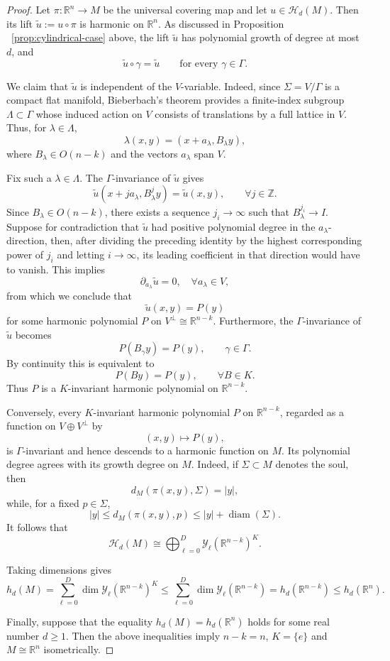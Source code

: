 \documentclass[12pt]{amsart}
\theoremstyle{plain}
\theoremstyle{definition}
\theoremstyle{remark}     %
\numberwithin{equation}{section}
\begin{document}
\begin{proof}
Let
$
\pi:\mathbb R^n\longrightarrow M
$
be the universal covering map and let $u\in\mathcal H_d(M)$. Then its lift
$\widetilde u:=u\circ\pi$
is harmonic on $\mathbb R^n$. 
As discussed in Proposition ~\ref{prop:cylindrical-case} above, the lift $\widetilde u$ has polynomial growth of degree at most $d$, and
\[
\widetilde u\circ\gamma=\widetilde u
\qquad\text{for every }\gamma\in\Gamma.
\]

We claim that $\widetilde u$ is independent of the $V$-variable.
Indeed, since $\Sigma=V/\Gamma$ is a compact flat manifold, Bieberbach's
theorem provides a finite-index subgroup $\Lambda\subset\Gamma$ whose
induced action on $V$ consists of translations by a full lattice in
$V$.  Thus, for $\lambda\in\Lambda$,
\[
\lambda(x,y)
=
(x+a_\lambda,B_\lambda y),
\]
where $B_\lambda\in O(n-k)$ and the vectors $a_\lambda$ span $V$.

Fix such a $\lambda\in \Lambda$.  The $\Gamma$-invariance of $\widetilde u$ gives
\[
\widetilde u(x+ja_\lambda,B_\lambda^j y)
=
\widetilde u(x,y),
\qquad \forall j\in\mathbb Z.
\]
Since $B_\lambda\in O(n-k)$, there exists a sequence
$j_i\to\infty$ such that $B_\lambda^{j_i}\longrightarrow I.$
Suppose for contradiction that $\widetilde u$ had positive polynomial degree in the
$a_\lambda$-direction, then, after dividing the preceding identity by
the highest corresponding power of $j_i$ and letting
$i\to\infty$, its leading coefficient in that direction would have
to vanish.  This implies 
\[
\partial_{a_\lambda}\widetilde u=0,\quad  \forall a_{\lambda}\in V,
\]
from which we conclude that
\[
\widetilde u(x,y)=P(y)
\]
for some harmonic polynomial $P$ on $V^\perp\cong \mathbb R^{n-k}$.
Furthermore, the $\Gamma$-invariance of $\tilde{u}$ becomes
\[
P(B_\gamma y)=P(y),
\qquad \gamma\in\Gamma.
\]
By continuity this is equivalent to
\[
P(By)=P(y),
\qquad \forall B\in K.
\]
Thus $P$ is a $K$-invariant harmonic polynomial on $\mathbb R^{n-k}$.

Conversely, every $K$-invariant harmonic polynomial $P$ on
$\mathbb R^{n-k}$, regarded as a function on
$V\oplus V^\perp$ by
\[
(x,y)\longmapsto P(y),
\]
is $\Gamma$-invariant and hence descends to a harmonic function on
$M$.  Its polynomial degree agrees with its growth degree on $M$.
Indeed, if $\Sigma\subset M$ denotes the soul, then
\[
d_M(\pi(x,y),\Sigma)=|y|,
\]
while, for a fixed $p\in \Sigma$,
\[
|y|
\leq
d_M(\pi(x,y),p)
\leq
|y|+\operatorname{diam}(\Sigma).
\]
It follows that
\[
\mathcal H_d(M)
\cong
\bigoplus_{\ell=0}^{D}
\mathcal Y_\ell(\mathbb R^{n-k})^K.
\]

Taking dimensions gives
\[
h_d(M)
=
\sum_{\ell=0}^{D}
\dim\mathcal Y_\ell(\mathbb R^{n-k})^K
\leq
\sum_{\ell=0}^{D}
\dim\mathcal Y_\ell(\mathbb R^{n-k})
=
h_d(\mathbb R^{n-k})
\leq h_d(\mathbb{R}^n).
\]

Finally, suppose that the equality $h_d(M)=h_d(\mathbb R^n)$
holds for some real number $d\geq1$. Then  the above inequalities imply $n-k=n$, $K=\{e\}$ and
$M \cong \mathbb{R}^n$
isometrically.
\end{proof}
\end{document}
